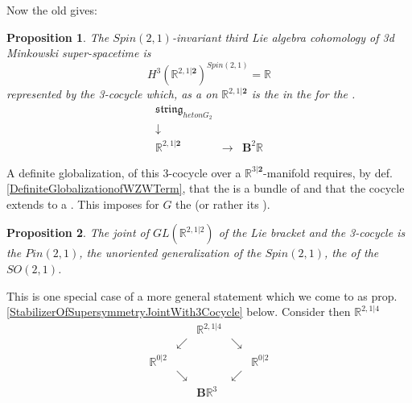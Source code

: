 \documentclass[12pt,titlepage]{article}
\newcommand{\itexarray}[1]{\begin{matrix}#1\end{matrix}}
\theoremstyle{plain}
\newtheorem{prop}{Proposition}
\theoremstyle{definition}
\theoremstyle{remark}
\begin{document}
Now the old  gives:
\begin{prop}
\label{}\hypertarget{}{}
The $Spin(2,1)$-invariant third Lie algebra cohomology of 3d Minkowski super-spacetime is
\begin{displaymath}
H^3(\mathbb{R}^{2,1\vert \mathbf{2}})^{Spin(2,1)} = \mathbb{R}
\end{displaymath}
represented by the 3-cocycle which, as a   on $\mathbb{R}^{2,1\vert \mathbf{2}}$ is the  in the  for the .
\begin{displaymath}
\itexarray{
\mathfrak{string}_{het  on  G_2}
\\
\downarrow
\\
\mathbb{R}^{2,1\vert \mathbf{2}}
&\stackrel{}{\longrightarrow}&
\mathbf{B}^2 \mathbb{R}
}
\end{displaymath}
\end{prop}
A definite globalization, of this 3-cocycle over a $\mathbb{R}^{3\vert \mathbf{2}}$-manifold requires, by def. \ref{DefiniteGlobalizationofWZWTerm}, that the  is a bundle of  and that the cocycle extends to a . This imposes  for $G$ the  (or rather its  ).
\begin{prop}
\label{}\hypertarget{}{}
The joint  of $GL(\mathbb{R}^{2,1\vert 2})$ of the Lie bracket and the 3-cocycle is the  $Pin(2,1)$, the unoriented generalization of the  $Spin(2,1)$, the  of the  $SO(2,1)$.
\end{prop}
This is one special case of a more general statement which we come to as prop. \ref{StabilizerOfSupersymmetryJointWith3Cocycle} below.
Consider then $\mathbb{R}^{2,1\vert 4}$
\begin{displaymath}
\itexarray{
&& \mathbb{R}^{2,1\vert 4}
\\
& \swarrow && \searrow
\\
\mathbb{R}^{0 \vert 2} && && \mathbb{R}^{0\vert 2}
\\
& \searrow && \swarrow
\\
&& \mathbf{B} \mathbb{R}^3
}
\end{displaymath}
\end{document}
